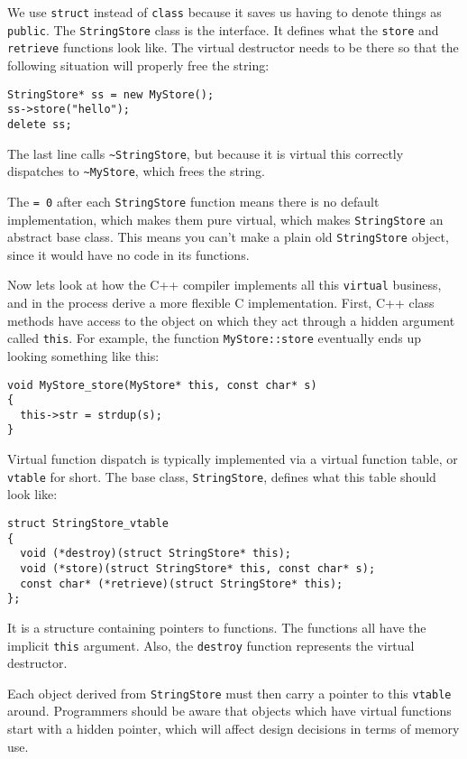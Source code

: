 \documentclass{article}
\begin{document}
We use \verb+struct+ instead of \verb+class+ because it saves us having
to denote things as \verb+public+.
The \verb+StringStore+ class is the interface.
It defines what the \verb+store+ and \verb+retrieve+ functions look like.
The virtual destructor needs to be there so that the following situation
will properly free the string:

\begin{lstlisting}
StringStore* ss = new MyStore();
ss->store("hello");
delete ss;
\end{lstlisting}

The last line calls \verb+~StringStore+, but because it is virtual
this correctly dispatches to \verb+~MyStore+, which frees the string.

The \verb+= 0+ after each \verb+StringStore+ function means there is no
default implementation, which makes them pure virtual, which makes
\verb+StringStore+ an abstract base class.
This means you can't make a plain old \verb+StringStore+ object, since
it would have no code in its functions.

Now lets look at how the C++ compiler implements all this \verb+virtual+
business, and in the process derive a more flexible C implementation.
First, C++ class methods have access to the object on which they act
through a hidden argument called \verb+this+.
For example, the function \verb+MyStore::store+ eventually ends up
looking something like this:

\begin{lstlisting}
void MyStore_store(MyStore* this, const char* s)
{
  this->str = strdup(s);
}
\end{lstlisting}

Virtual function dispatch is typically implemented via a virtual
function table, or \verb+vtable+ for short.
The base class, \verb+StringStore+, defines what this table
should look like:

\begin{lstlisting}
struct StringStore_vtable
{
  void (*destroy)(struct StringStore* this);
  void (*store)(struct StringStore* this, const char* s);
  const char* (*retrieve)(struct StringStore* this);
};
\end{lstlisting}

It is a structure containing pointers to functions.
The functions all have the implicit \verb+this+ argument.
Also, the \verb+destroy+ function represents the virtual destructor.

Each object derived from \verb+StringStore+ must then carry a pointer
to this \verb+vtable+ around.
Programmers should be aware that objects which have virtual functions
start with a hidden pointer, which will affect design decisions in terms
of memory use.
\end{document}
